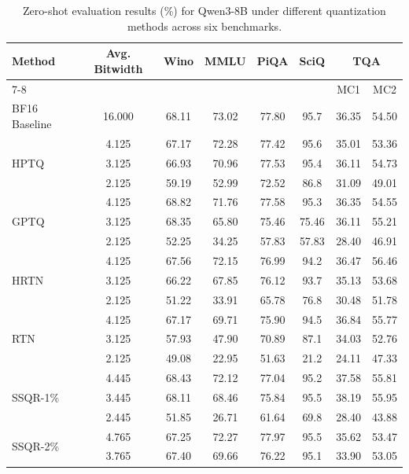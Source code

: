 \documentclass{article} %
\begin{document}
\begin{table}[htpb]
\caption{Zero-shot evaluation results (\%) for Qwen3-8B under different quantization methods across six benchmarks.}
\label{tab:qwen8_eval_tasks}
\begin{center}
\begin{tabular}{lccccccc}
\toprule
Method & Avg. Bitwidth & Wino & MMLU & PiQA & SciQ & \multicolumn{2}{c}{TQA}  \\
\cmidrule(r){7-8}
      &           &           &           &            &           & MC1 & MC2 \\
\midrule
BF16 Baseline & 16.000 & 68.11 & 73.02 & 77.80 & 95.7 & 36.35 & 54.50 \\
\midrule
\multirow{3}{*}{HPTQ} & 4.125 & 67.17 & 72.28 & 77.42 & 95.6 & 35.01 & 53.36 \\
           & 3.125 & 66.93 & 70.96 & 77.53 & 95.4 & 36.11 & 54.73 \\
           & 2.125 & 59.19 & 52.99 & 72.52 & 86.8 & 31.09 & 49.01  \\
\midrule
\multirow{3}{*}{GPTQ} & 4.125 & 68.82 & 71.76 & 77.58 & 95.3 & 36.35 & 54.55 \\
           & 3.125 & 68.35 & 65.80 & 75.46 & 75.46 & 36.11 & 55.21 \\
           & 2.125 & 52.25 & 34.25 & 57.83 & 57.83 & 28.40 & 46.91 \\
\midrule
\multirow{3}{*}{HRTN}   & 4.125 & 67.56 & 72.15 & 76.99 & 94.2 & 36.47 & 56.46 \\
           & 3.125 & 66.22 & 67.85 & 76.12 & 93.7 & 35.13 & 53.68 \\
           & 2.125 & 51.22 & 33.91 & 65.78 & 76.8 & 30.48 & 51.78 \\
\midrule
\multirow{3}{*}{RTN}   & 4.125 & 67.17 & 69.71 & 75.90 & 94.5 & 36.84 & 55.77 \\
           & 3.125 & 57.93 & 47.90 & 70.89 & 87.1 & 34.03 & 52.76 \\
           & 2.125 & 49.08 & 22.95 & 51.63 & 21.2 & 24.11 & 47.33 \\
\midrule
\multirow{3}{*}{SSQR-1\%} 
 & 4.445 & 68.43 & 72.12 & 77.04 & 95.2 & 37.58 & 55.81 \\
 & 3.445 & 68.11 & 68.46 & 75.84 & 95.5 & 38.19 & 55.95 \\
 & 2.445 & 51.85 & 26.71 & 61.64 & 69.8 & 28.40 & 43.88 \\
\midrule
\multirow{3}{*}{SSQR-2\%}  
 & 4.765 & 67.25 & 72.27 & 77.97 & 95.5 & 35.62 & 53.47 \\
 & 3.765 & 67.40 & 69.66 & 76.22 & 95.1 & 33.90 & 53.05 \\

\end{tabular}
\end{center}
\end{table}
\end{document}
